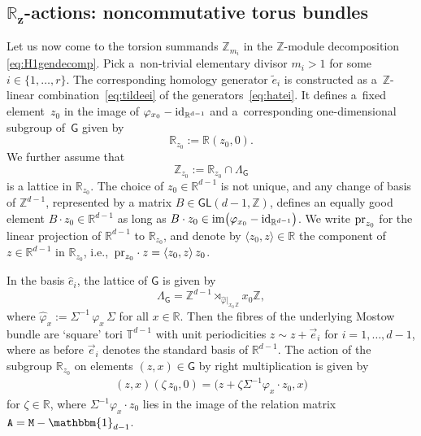 \documentclass[10pt,a4paper]{amsart}
\numberwithin{equation}{section}
\newcommand{\Z}{\zed}
\def\Id{{\rm id}}
\newcommand{\unit}{\mathbbm{1}} 			%
\newcommand{\sfG}{\mathsf{G}}
\newcommand{\sfGL}{\mathsf{GL}}
\newcommand{\ttM}{\mathtt{M}}
\newcommand{\R}{\real}
\newcommand{\zed}{{\mathbb Z}} %
\newcommand{\real}{{\mathbb R}} %
\newcommand{\torus}{{\mathbb T}} %
\newcommand{\proj}{{\rm pr}}
\begin{document}
\subsection[$\real_z$-actions: noncommutative torus bundles]{$\boldsymbol{\real_z}$-actions: noncommutative torus bundles}\label{sec:Rzgen}

Let us now come to the torsion summands $\Z_{m_i}$ in the
$\Z$-module decomposition \eqref{eq:H1gendecomp}. Pick a~non-trivial
elementary divisor $m_i>1$ for some $i\in\{1,\dots,r\}$. The
corresponding homology generator $\tilde e_i$ is constructed as a~$\Z$-linear combination~\eqref{eq:tildeei} of the generators~\eqref{eq:hatei}. It defines a~fixed
element~$z_0$ in the image of $\varphi_{x_0}-\rm{id}_{\R^{d-1}}$ and a~corresponding one-dimensional subgroup of~$\sfG$ given by
\[
\R_{z_0} := \R (z_0,0) .
\]
We further assume that
\[
\Z_{ z_0} := \R_{ z_0}\cap\Lambda_\sfG
\]
is a lattice in $\R_{z_0}$.
The choice of $z_0\in\R^{d-1}$ is not unique, and
any change of basis of $\Z^{d-1}$, represented by a matrix
$B\in\sfGL(d-1,\Z)$, defines an equally good element $B\cdot
z_0\in\R^{d-1}$ as long as $B\cdot
z_0\in{\rm im}\big(\varphi_{x_0}-\Id_{\R^{d-1}}\big)$. We write $\proj_{z_0}$ for the
linear projection of $\R^{d-1}$ to $\R_{z_0}$, and denote by $\langle
z_0,z\rangle\in\R$ the component of $z\in\R^{d-1}$ in $\R_{z_0}$,
i.e.,~$\proj_{z_0}\cdot z = \langle z_0,z\rangle \, z_0$.

In the basis $\hat e_i$, the lattice of $\sfG$ is given by
\[
\Lambda_\sfG=\Z^{d-1}\rtimes_{\hat\varphi|_{x_0\,\Z}} x_0 \Z ,
\]
where $\hat\varphi_x:=\Sigma^{-1}\,\varphi_x\,\Sigma$ for all
$x\in\R$. Then the fibres of the underlying Mostow bundle are `square' tori
$\torus^{d-1}$ with unit periodicities $ z\sim z+\vec
e_i$ for $i=1,\dots,d-1$, where as
before $\vec e_i$ denotes the standard basis of
$\R^{d-1}$. The action of the
subgroup $\R_{ z_0}$ on
elements $(z,x)\in\sfG$ by right multiplication is given by
\begin{gather}\label{eq:Rz0action}
(z,x) (\zeta\,z_0,0) = \big(z+\zeta \Sigma^{-1} \varphi_x\cdot
z_0,x\big)
\end{gather}
for $\zeta\in\R$, where $\Sigma^{-1} \varphi_x\cdot z_0$ lies in the
image of the relation matrix ${\tt A}=\ttM-\unit_{d-1}$.
\end{document}
